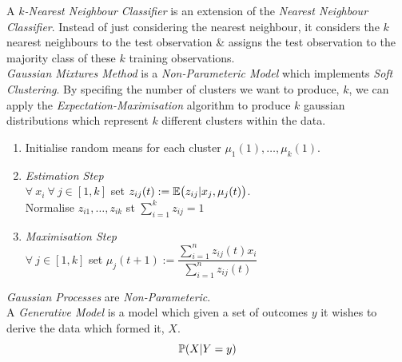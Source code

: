\documentclass[11pt,a4paper]{article}
\begin{document}
A \textit{$k$-Nearest Neighbour Classifier} is an extension of the \textit{Nearest Neighbour Classifier}. Instead of just considering the nearest neighbour, it considers the $k$ nearest neighbours to the test observation \& assigns the test observation to the majority class of these $k$ training observations.\\

\textit{Gaussian Mixtures Method} is a \textit{Non-Parameteric Model} which implements \textit{Soft Clustering}. By specifing the number of clusters we want to produce, $k$, we can apply the \textit{Expectation-Maximisation} algorithm to produce $k$ gaussian distributions which represent $k$ different clusters within the data.
\begin{enumerate}[label=\arabic*)]
	\item Initialise random means for each cluster $\mu_1(1),\dots,\mu_k(1)$.
	\item\textit{Estimation Step}\\
	$\forall\ x_i\ \forall\ j\in[1,k]$ set $z_{ij}(t):=\mathbb{E}\big(z_{ij}|x_j,\mu_j(t)\big)$.\\
	Normalise $z_{i1},\dots,z_{ik}$ st $\sum_{i=1}^kz_{ij}=1$
	\item \textit{Maximisation Step}\\
	$\forall\ j\in[1,k]$ set $\mu_j(t+1):=\dfrac{\sum_{i=1}^nz_{ij}(t)x_i}{\sum_{i=1}^nz_{ij}(t)}$
\end{enumerate}

\textit{Gaussian Processes} are \textit{Non-Parameteric}.\\

A \textit{Generative Model} is a model which given a set of outcomes $y$ it wishes to derive the data which formed it, $X$.
$$\mathbb{P}(X|Y=y)$$
\end{document}
